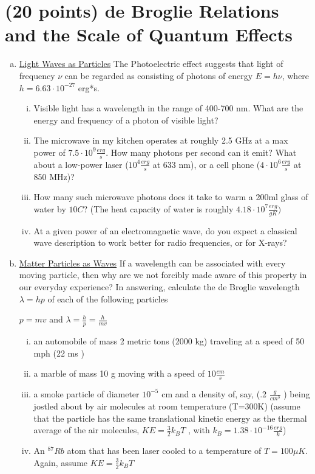 \documentclass[ps1.tex]{subfiles}
\begin{document}
\section* {(20 points) de Broglie Relations and the Scale of Quantum Effects}

\begin{enumerate}[(a)]
\item \underline{Light Waves as Particles}
The Photoelectric effect suggests that light of frequency $\nu$ can be regarded as consisting of photons of energy $E = h\nu$, where $h = 6.63\cdot10^{-27}$ erg*s.
\begin{enumerate}[i.]
\item Visible light has a wavelength in the range of 400-700 nm. What are the energy and frequency of a photon of visible light?
\item The microwave in my kitchen operates at roughly 2.5 GHz at a max power of $7.5\cdot10^9 \frac {erg}{s}$. How many photons per second can it emit? What about a low-power laser ($10^4 \frac{erg}{s}$ at 633 nm), or a cell phone ($4\cdot10^6 \frac{erg}{s}$ at 850 MHz)?
\item How many such microwave photons does it take to warm a 200ml glass of water by $10C$? (The heat capacity of water is roughly $4.18\cdot10^7 \frac {erg}{gK})$
\item At a given power of an electromagnetic wave, do you expect a classical wave
description to work better for radio frequencies, or for X-rays?
\end{enumerate}
\item \underline{Matter Particles as Waves}
If a wavelength can be associated with every moving particle, then why are we not forcibly made aware of this property in our everyday experience? In answering, calculate the de Broglie wavelength $\lambda = hp$ of each of the following particles

$p = mv$ and $\lambda = \frac {h}{p} = \frac {h}{mv}$

\begin{enumerate}[i.]
\item an automobile of mass 2 metric tons (2000 kg) traveling at a speed of 50 mph (22 ms )
\item a marble of mass 10 g moving with a speed of $10 \frac {cm}{s}$
\item a smoke particle of diameter $10^{-5}$ cm and a density of, say, (.2 $\frac {g}{cm^3}$  ) being
jostled about by air molecules at room temperature (T=300K) (assume that
the particle has the same translational kinetic energy as the thermal average
of the air molecules, $KE = \frac {3}{2} k_B T$ , with $k_B = 1.38\cdot10^{-16} \frac {erg}{k}$)
\item An $^{87}Rb$ atom that has been laser cooled to a temperature of $T = 100 \mu K$. Again, assume $KE = \frac {3}{2} k_B T$
\end{enumerate}
\end{enumerate}
\end{document}
